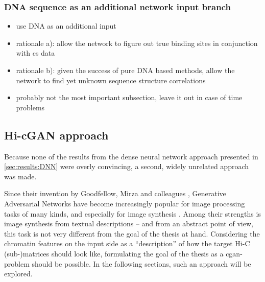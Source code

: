  

\subsubsection{DNA sequence as an additional network input branch}
\begin{itemize}
 \item use DNA as an additional input
 \item rationale a): allow the network to figure out true binding sites in conjunction with cs data
 \item rationale b): given the success of pure DNA based methods, allow the network to find yet unknown sequence structure correlations
 \item probably not the most important subsection, leave it out in case of time problems
\end{itemize}

\subsection{Hi-cGAN approach} \label{sec:improve:Hi-cGAN}
Because none of the results from the dense neural network approach presented in \cref{sec:results:DNN} were overly convincing,
a second, widely unrelated approach was made.

Since their invention by Goodfellow, Mirza and colleagues \cite{Goodfellow2014, mirza2014},
Generative Adversarial Networks have become increasingly popular for image processing tasks of many kinds,
and especially for image synthesis \cite{Wang2020}. 
Among their strengths is image synthesis from textual descriptions \cite{Reed2016,Zhang2019c,Zhu2019,Tao2020} --
and from an abstract point of view, this task is not very different from the goal of the thesis at hand.
Considering the chromatin features on the input side as a ``description'' of how the target Hi-C (sub-)matrices should look like,
formulating the goal of the thesis as a \acrshort{cgan}-problem should be possible.
In the following sections, such an approach will be explored.

